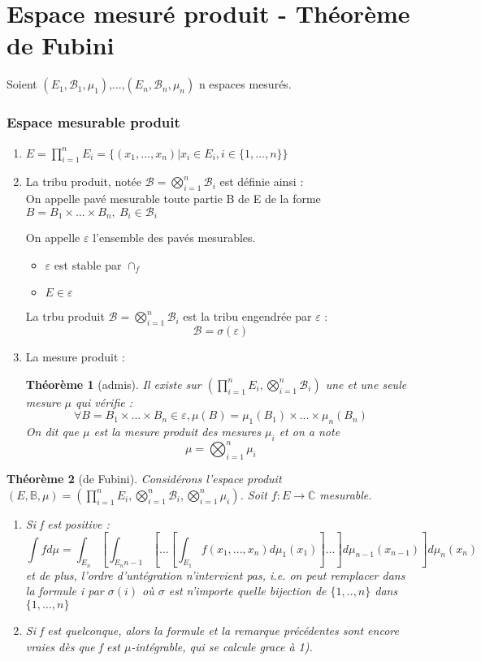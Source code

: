 \documentclass{article}
\theoremstyle{mes_theoremes}
\newtheorem{theo}{Théorème}[section]
\begin{document}
\newpage
\part{Espace mesuré produit - Théorème de Fubini}
Soient $(E_1,\mathcal{B}_1,\mu_1)$,...,$(E_n,\mathcal{B}_n,\mu_n)$ n espaces mesurés.
\section{Espace mesurable produit}
\begin{enumerate}
\item $E=\prod_{i=1}^n E_i = \{(x_1,...,x_n)|x_i\in E_i, i\in\{1,...,n\}\}$
\item La tribu produit, notée $\mathcal{B}=\bigotimes_{i=1}^n \mathcal{B}_i$ est définie ainsi : \\
On appelle pavé mesurable toute partie B de E de la forme $B=B_1 \times ... \times B_n,\ B_i \in \mathcal{B}_i$

\bigskip
On appelle $\varepsilon$ l'ensemble des pavés mesurables.
\begin{itemize}
\item $\varepsilon$ est stable par $\cap_f$
\item $E\in \varepsilon$
\end{itemize}
La trbu produit $\mathcal{B}=\bigotimes_{i=1}^n \mathcal{B}_i$ est la tribu engendrée par $\varepsilon$ : \[\mathcal{B}=\sigma(\varepsilon)\]

\item La mesure produit :
\begin{theo}[admis]
Il existe sur $(\prod_{i=1}^n E_i,\bigotimes_{i=1}^n \mathcal{B}_i)$ une et une seule mesure $\mu$ qui vérifie : 
\[\forall B=B_1\times...\times B_n\in \varepsilon, \mu(B)=\mu_1(B_1)\times ... \times \mu_n(B_n)\]
On dit que $\mu$ est la mesure produit des mesures $\mu_i$ et on a note \[\mu=\bigotimes_{i=1}^n \mu_i\]
\end{theo}
\end{enumerate}

\begin{theo}[de Fubini]
Considérons l'espace produit $(E,\mathbb{B},\mu)=(\prod_{i=1}^n E_i,\bigotimes_{i=1}^n \mathcal{B}_i,\bigotimes_{i=1}^n \mu_i)$. Soit $f:E\rightarrow\mathbb{C}$ mesurable.\begin{enumerate}
\item Si f est positive : \[\int fd\mu = \int_{E_n}\left[\int_{E_n{n-1}} \left[... \left[\int_{E_1} f(x_1,...,x_n) d\mu_1(x_1) \right]... \right]d\mu_{n-1}(x_{n-1}) \right] d\mu_n(x_n)\]
et de plus, l'ordre d'untégration n'intervient pas, i.e. on peut remplacer dans la formule i par $\sigma(i)$ où $\sigma$ est n'importe quelle bijection de $\{1,..,n\}$ dans $\{1,...,n\}$
\item Si f est quelconque, alors la formule et la remarque précédentes sont encore vraies dès que f est $\mu$-intégrable, qui se calcule grace à 1).
\end{enumerate}
\end{theo}
\end{document}
